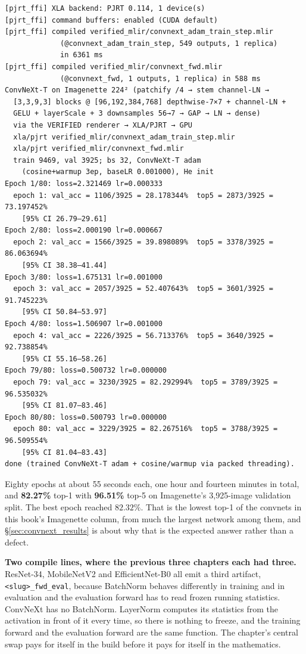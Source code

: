 \begin{verbatim}
[pjrt_ffi] XLA backend: PJRT 0.114, 1 device(s)
[pjrt_ffi] command buffers: enabled (CUDA default)
[pjrt_ffi] compiled verified_mlir/convnext_adam_train_step.mlir
             (@convnext_adam_train_step, 549 outputs, 1 replica)
             in 6361 ms
[pjrt_ffi] compiled verified_mlir/convnext_fwd.mlir
             (@convnext_fwd, 1 outputs, 1 replica) in 588 ms
ConvNeXt-T on Imagenette 224² (patchify /4 → stem channel-LN →
  [3,3,9,3] blocks @ [96,192,384,768] depthwise-7×7 + channel-LN +
  GELU + layerScale + 3 downsamples 56→7 → GAP → LN → dense)
  via the VERIFIED renderer → XLA/PJRT → GPU
  xla/pjrt verified_mlir/convnext_adam_train_step.mlir
  xla/pjrt verified_mlir/convnext_fwd.mlir
  train 9469, val 3925; bs 32, ConvNeXt-T adam
    (cosine+warmup 3ep, baseLR 0.001000), He init
Epoch 1/80: loss=2.321469 lr=0.000333
  epoch 1: val_acc = 1106/3925 = 28.178344%  top5 = 2873/3925 = 73.197452%
    [95% CI 26.79–29.61]
Epoch 2/80: loss=2.000190 lr=0.000667
  epoch 2: val_acc = 1566/3925 = 39.898089%  top5 = 3378/3925 = 86.063694%
    [95% CI 38.38–41.44]
Epoch 3/80: loss=1.675131 lr=0.001000
  epoch 3: val_acc = 2057/3925 = 52.407643%  top5 = 3601/3925 = 91.745223%
    [95% CI 50.84–53.97]
Epoch 4/80: loss=1.506907 lr=0.001000
  epoch 4: val_acc = 2226/3925 = 56.713376%  top5 = 3640/3925 = 92.738854%
    [95% CI 55.16–58.26]
Epoch 79/80: loss=0.500732 lr=0.000000
  epoch 79: val_acc = 3230/3925 = 82.292994%  top5 = 3789/3925 = 96.535032%
    [95% CI 81.07–83.46]
Epoch 80/80: loss=0.500793 lr=0.000000
  epoch 80: val_acc = 3229/3925 = 82.267516%  top5 = 3788/3925 = 96.509554%
    [95% CI 81.04–83.43]
done (trained ConvNeXt-T adam + cosine/warmup via packed threading).
\end{verbatim}

Eighty epochs at about 55 seconds each, one hour and fourteen minutes in
total, and \textbf{82.27\%} top-1 with \textbf{96.51\%} top-5 on
Imagenette's 3,925-image validation split. The best epoch reached
$82.32\%$. That is the lowest top-1 of the convnets in this book's
Imagenette column, from much the largest network among them, and
\S\ref{sec:convnext_results} is about why that is the expected answer
rather than a defect.

\medskip\noindent\textbf{Two compile lines, where the previous three
chapters each had three.} ResNet-34, MobileNetV2 and EfficientNet-B0 all
emit a third artifact, \texttt{<slug>\_fwd\_eval}, because BatchNorm
behaves differently in training and in evaluation and the evaluation
forward has to read frozen running statistics. ConvNeXt has no
BatchNorm. LayerNorm computes its statistics from the activation in
front of it every time, so there is nothing to freeze, and the training
forward and the evaluation forward are the same function. The chapter's
central swap pays for itself in the build before it pays for itself in
the mathematics.

